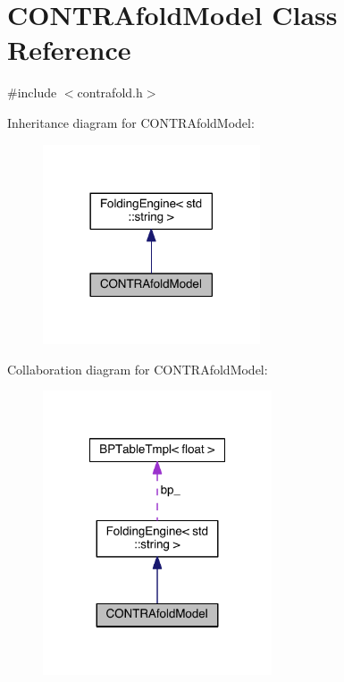\hypertarget{class_c_o_n_t_r_afold_model}{\section{C\+O\+N\+T\+R\+Afold\+Model Class Reference}
\label{class_c_o_n_t_r_afold_model}
}


{\ttfamily \#include $<$contrafold.\+h$>$}



Inheritance diagram for C\+O\+N\+T\+R\+Afold\+Model\+:
\nopagebreak
\begin{figure}[H]
\begin{center}
\leavevmode
\includegraphics[width=182pt]{class_c_o_n_t_r_afold_model__inherit__graph}
\end{center}
\end{figure}


Collaboration diagram for C\+O\+N\+T\+R\+Afold\+Model\+:
\nopagebreak
\begin{figure}[H]
\begin{center}
\leavevmode
\includegraphics[width=192pt]{class_c_o_n_t_r_afold_model__coll__graph}
\end{center}
\end{figure}
